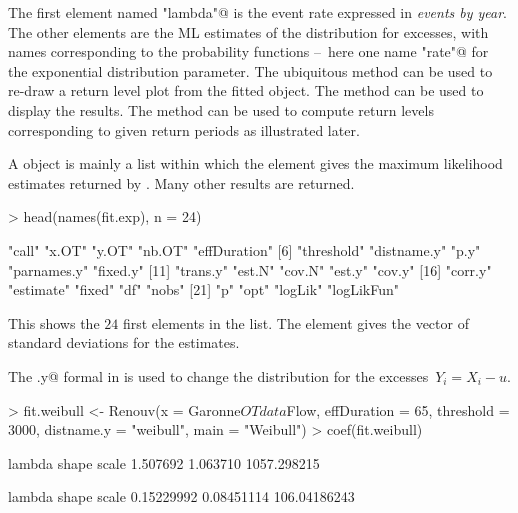 \documentclass[a4paper]{report}
\begin{document}
\noindent
The first element named \verb@"lambda"@
is the event rate expressed in \textit{events by year}. The other elements are the ML
estimates of the distribution for excesses, with names
corresponding to the probability functions --~here one name
\verb@"rate"@ for the exponential distribution parameter.
The ubiquitous
\verb@plot@ method can be used to re-draw a return level plot 
from the fitted object. The \verb@summary@ method can be used to display the results.
The \verb@predict@ method can be used to compute
return levels corresponding to given return periods as illustrated later.


A \verb@Renouv@ object is mainly a list within which the
\verb@estimate@ element gives the maximum likelihood estimates
returned by \verb@coef@. Many other results are returned.

\begin{Schunk}
\begin{Sinput}
> head(names(fit.exp), n = 24)
\end{Sinput}
\begin{Soutput}
 [1] "call"        "x.OT"        "y.OT"        "nb.OT"       "effDuration"
 [6] "threshold"   "distname.y"  "p.y"         "parnames.y"  "fixed.y"    
[11] "trans.y"     "est.N"       "cov.N"       "est.y"       "cov.y"      
[16] "corr.y"      "estimate"    "fixed"       "df"          "nobs"       
[21] "p"           "opt"         "logLik"      "logLikFun"  
\end{Soutput}
\end{Schunk}

\noindent
This shows the $24$ first elements in the list. The \verb@sigma@ element gives the
vector of standard deviations for the estimates.

The \verb@distname.y@ formal in \verb@Renouv@ 
is used to change the distribution for the excesses~$Y_i=X_i-u$.
\begin{Schunk}
\begin{Sinput}
> fit.weibull <- Renouv(x = Garonne$OTdata$Flow, effDuration = 65, threshold = 3000,
                        distname.y = "weibull", main = "Weibull")
> coef(fit.weibull)
\end{Sinput}
\begin{Soutput}
     lambda       shape       scale 
   1.507692    1.063710 1057.298215 
\end{Soutput}
\begin{Soutput}
      lambda        shape        scale 
  0.15229992   0.08451114 106.04186243 
\end{Soutput}
\end{Schunk}
\end{document}

